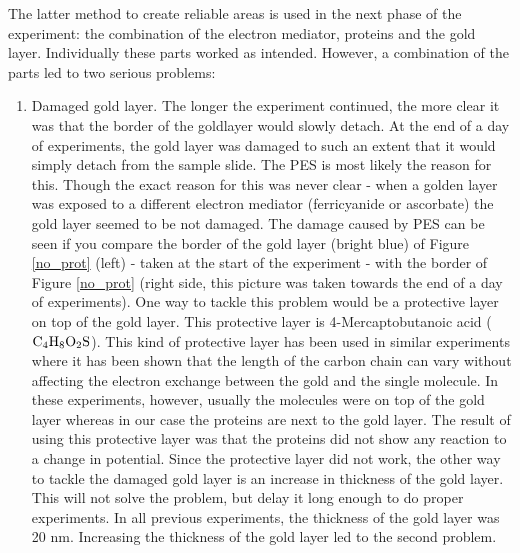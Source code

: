 \documentclass[twoside,single]{lion-msc}
\begin{document}
The latter method to create reliable areas is used in the next phase of the experiment: the combination of the electron mediator, proteins and the gold layer. Individually these parts worked as intended. However, a combination of the parts led to two serious problems:
\begin{enumerate}


\item Damaged gold layer.
The longer the experiment continued, the more clear it was that the border of the goldlayer would slowly detach. At the end of a day of experiments, the gold layer was damaged to such an extent that it would simply detach from the sample slide. The PES is most likely the reason for this. Though the exact reason for this was never clear - when a golden layer was exposed to a different electron mediator (ferricyanide or ascorbate) the gold layer seemed to be not damaged. The damage caused by PES can be seen if you compare the border of the gold layer (bright blue) of Figure \ref{no_prot} (left) - taken at the start of the experiment -  with the border of Figure \ref{no_prot} (right side, this picture was taken towards the end of a day of experiments). One way to tackle this problem would be a protective layer on top of the gold layer. This protective layer is 4-Mercaptobutanoic acid ($\textup{C}_{4}\textup{H}_{8}\textup{O}_{2}\textup{S}$). This kind of protective layer has been used in similar experiments \cite{Elmalk2012} where it has been shown that the length of the carbon chain can vary without affecting the electron exchange between the gold and the single molecule. In these experiments, however, usually the molecules were on top of the gold layer whereas in our case the proteins are next to the gold layer. The result of using this protective layer was that the proteins did not show any reaction to a change in potential. Since the protective layer did not work, the other way to tackle the damaged gold layer is an increase in thickness of the gold layer. This will not solve the problem, but delay it long enough to do proper experiments. In all previous experiments, the thickness of the gold layer was 20 nm. Increasing the thickness of the gold layer led to the second problem.



\end{enumerate}
\end{document}
